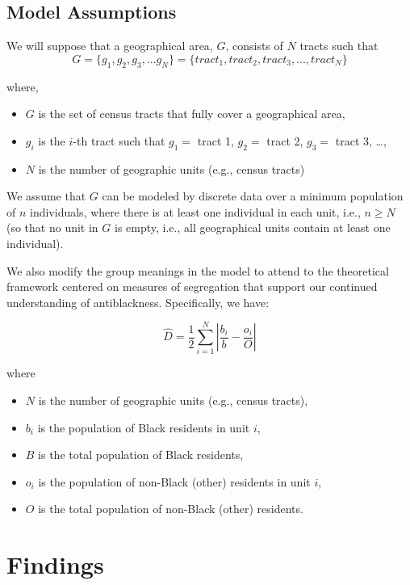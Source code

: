 \documentclass[
  letterpaper,
  DIV=11,
  numbers=noendperiod]{scrartcl}
\providecommand{\tightlist}{%
  \setlength{\itemsep}{0pt}\setlength{\parskip}{0pt}}\usepackage{longtable,booktabs,array}
\begin{document}
\subsection{Model Assumptions}\label{model-assumptions}

We will suppose that a geographical area, \(G\), consists of \(N\)
tracts such that
\[G = \{g_1, g_2, g_3, ...g_N\} = \{tract_1, tract_2, tract_3, ..., tract_N\}\]

where,

\begin{itemize}
\tightlist
\item
  \(G\) is the set of census tracts that fully cover a geographical
  area,
\item
  \(g_i\) is the \(i\)-th tract such that \(g_1 =\) tract 1, \(g_2 =\)
  tract 2, \(g_3 =\) tract 3, \ldots,
\item
  \(N\) is the number of geographic units (e.g., census tracts)
\end{itemize}

We assume that \(G\) can be modeled by discrete data over a minimum
population of \(n\) individuals, where there is at least one individual
in each unit, i.e., \(n \ge N\) (so that no unit in \(G\) is empty,
i.e., all geographical units contain at least one individual).

We also modify the group meanings in the model to attend to the
theoretical framework centered on measures of segregation that support
our continued understanding of antiblackness. Specifically, we have:

\[
\hat{D} = \frac{1}{2} \sum_{i=1}^N \left| \dfrac{b_i}{b} - \dfrac{o_i}{O} \right|
\]

where

\begin{itemize}
\tightlist
\item
  \(N\) is the number of geographic units (e.g., census tracts),
\item
  \(b_i\) is the population of Black residents in unit \(i\),
\item
  \(B\) is the total population of Black residents,
\item
  \(o_i\) is the population of non-Black (other) residents in unit
  \(i\),
\item
  \(O\) is the total population of non-Black (other) residents.
\end{itemize}

\section{Findings}\label{findings}
\end{document}
